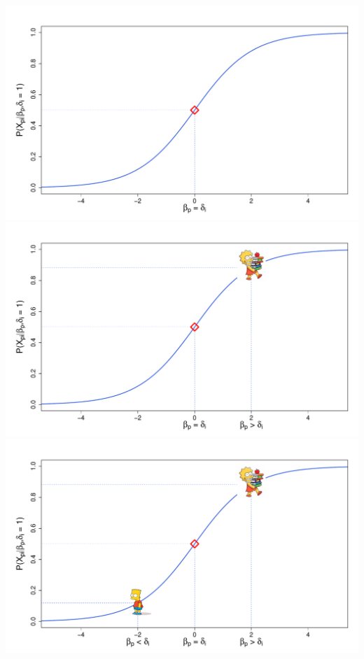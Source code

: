 \documentclass{beamer}
\begin{document}
\begin{frame}
\centering

\begin{overprint}
	
	\includegraphics[width=\linewidth]{base.pdf}
	\onslide<2>\includegraphics[width=\linewidth]{lisa.pdf}
	\onslide<3>\includegraphics[width=\linewidth]{bart.pdf}
	
	
\end{overprint}

\end{frame}
\end{document}
